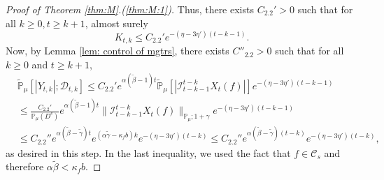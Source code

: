 \documentclass[EJP]{ejpecp} %
\begin{document}
\begin{proof}[Proof of Theorem \ref{thm:M}.(\ref{thm:M:1})]
	Thus, there exists $C_{2.2}'> 0$ such that for all $k \geq 0, t\geq k+1$, almost surely
\[
    K_{t,k}
    \leq C_{2.2}' e^{-(\eta - 3\eta')(t-k-1)}.
\]
 	Now, by Lemma \ref{lem: control of mgtrs}, there exists $C''_{2.2}>0$ such that for all $k\geq 0$ and $t\geq k+1$,
\begin{align}
	\label{eq: Y in D}
    & \mathbb{\widetilde{P}}_{\mu} [|Y_{t,k}| ; \mathcal{D}_{t,k} ]
    \leq C_{2.2}' e^{\alpha (\tilde \beta - 1)t} \mathbb{\widetilde{P}}_{\mu} [ | \mathcal{I}_{t-k-1}^{t-k}X_t(f)| ] e^{-(\eta - 3\eta')(t-k-1)} \\
    & \leq \frac{C_{2.2}' } {\mathbb{P}_{\mu}(D^c)} e^{ \alpha (\tilde \beta - 1)t} \|\mathcal{I}_{t-k-1}^{t-k} X_t(f)\|_{\mathbb P_\mu; 1+\gamma} e^{-(\eta - 3\eta')(t-k - 1)} \\
    & \leq C_{2.2}'' e^{\alpha(\tilde \beta - \tilde \gamma)t} e^{ (\alpha \tilde \gamma - \kappa_f b)k} e^{-(\eta - 3\eta')(t-k)}
    \leq C_{2.2}'' e^{\alpha(\tilde \beta - \tilde \gamma)(t-k)} e^{-(\eta - 3\eta')(t-k)},
\end{align}
	as desired in this step.
	In the last inequality, we used the fact that $f\in \mathcal C_s$ and therefore $\alpha \tilde \beta < \kappa_f b$.


\end{proof}
\end{document}
